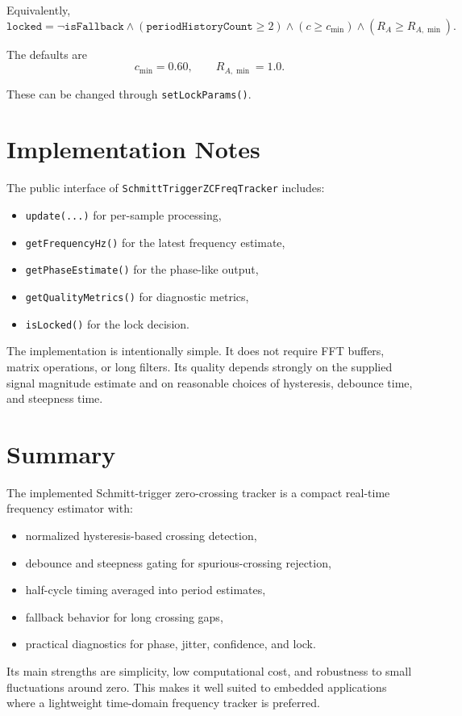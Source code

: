 \documentclass[conference]{IEEEtran}
\begin{document}
Equivalently,
\begin{equation}
  \texttt{locked}
  =
  \neg\texttt{isFallback}
  \land
  (\texttt{periodHistoryCount}\ge 2)
  \land
  (c \ge c_{\min})
  \land
  (R_A \ge R_{A,\min}).
\end{equation}

The defaults are
\begin{equation}
  c_{\min} = 0.60,
  \qquad
  R_{A,\min} = 1.0.
\end{equation}

These can be changed through \texttt{setLockParams()}.

\section{Implementation Notes}

The public interface of \texttt{SchmittTriggerZCFreqTracker} includes:
\begin{itemize}[leftmargin=1.4em]
  \item \texttt{update(...)} for per-sample processing,
  \item \texttt{getFrequencyHz()} for the latest frequency estimate,
  \item \texttt{getPhaseEstimate()} for the phase-like output,
  \item \texttt{getQualityMetrics()} for diagnostic metrics,
  \item \texttt{isLocked()} for the lock decision.
\end{itemize}

The implementation is intentionally simple. It does not require FFT buffers,
matrix operations, or long filters. Its quality depends strongly on the
supplied signal magnitude estimate and on reasonable choices of hysteresis,
debounce time, and steepness time.

\section{Summary}

The implemented Schmitt-trigger zero-crossing tracker is a compact real-time
frequency estimator with:
\begin{itemize}[leftmargin=1.4em]
  \item normalized hysteresis-based crossing detection,
  \item debounce and steepness gating for spurious-crossing rejection,
  \item half-cycle timing averaged into period estimates,
  \item fallback behavior for long crossing gaps,
  \item practical diagnostics for phase, jitter, confidence, and lock.
\end{itemize}

Its main strengths are simplicity, low computational cost, and robustness to
small fluctuations around zero. This makes it well suited to embedded
applications where a lightweight time-domain frequency tracker is preferred.
\end{document}
